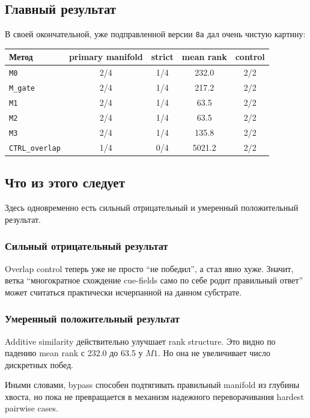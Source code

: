 \subsection{Главный результат}

В своей окончательной, уже подправленной версии \texttt{8a} дал очень чистую
картину:

\begin{center}
\begin{tabular}{lcccc}
\toprule
Метод & primary manifold & strict & mean rank & control \\
\midrule
\texttt{M0} & 2/4 & 1/4 & 232.0 & 2/2 \\
\texttt{M\_gate} & 2/4 & 1/4 & 217.2 & 2/2 \\
\texttt{M1} & 2/4 & 1/4 & 63.5 & 2/2 \\
\texttt{M2} & 2/4 & 1/4 & 63.5 & 2/2 \\
\texttt{M3} & 2/4 & 1/4 & 135.8 & 2/2 \\
\texttt{CTRL\_overlap} & 1/4 & 0/4 & 5021.2 & 2/2 \\
\bottomrule
\end{tabular}
\end{center}

\subsection{Что из этого следует}

Здесь одновременно есть сильный отрицательный и умеренный положительный
результат.

\subsubsection*{Сильный отрицательный результат}

Overlap control теперь уже не просто ``не победил'', а стал явно хуже. Значит,
ветка ``многократное схождение cue-fields само по себе родит правильный
ответ'' может считаться практически исчерпанной на данном субстрате.

\subsubsection*{Умеренный положительный результат}

Additive similarity действительно улучшает rank structure. Это видно по падению
mean rank с 232.0 до 63.5 у \(M1\). Но она не увеличивает число дискретных
побед.

Иными словами, bypass способен подтягивать правильный manifold из глубины хвоста,
но пока не превращается в механизм надежного переворачивания hardest pairwise
cases.

